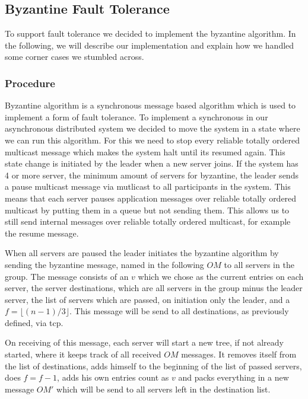 \documentclass[runningheads]{llncs}
\begin{document}
\subsection{Byzantine Fault Tolerance} \label{byzantine}

To support fault tolerance we decided to implement the byzantine algorithm. In
the following, we will describe our implementation and explain how we handled
some corner cases we stumbled across.

\subsubsection{Procedure} \label{byzantineprocedure}

Byzantine algorithm is a synchronous message based algorithm which is used to
implement a form of fault tolerance. To implement a synchronous in our
asynchronous distributed system we decided to move the system in a state where
we can run this algorithm. For this we need to stop every reliable totally
ordered multicast message which makes the system halt until its resumed again.
This state change is initiated by the leader when a new server joins. If the
system has 4 or more server, the minimum amount of servers for byzantine, the
leader sends a pause multicast message via mutlicast to all participants in the
system. This means that each server pauses application messages over reliable
totally ordered multicast by putting them in a queue but not sending them. This
allows us to still send internal messages over reliable totally ordered
multicast, for example the resume message.

When all servers are paused the leader initiates the byzantine algorithm by
sending the byzantine message, named in the following $OM$ to all servers in
the group. The message consists of an $v$ which we chose as the current entries
on each server, the server destinations, which are all servers in the group
minus the leader server, the list of servers which are passed, on initiation
only the leader, and a $f = \lfloor (n - 1)/ 3 \rfloor$. This message will be
send to all destinations, as previously defined, via tcp.

On receiving of this message, each server will start a new tree, if not already
started, where it keeps track of all received $OM$ messages. It removes itself
from the list of destinations, adds himself to the beginning of the list of
passed servers, does $f = f - 1$, adds his own entries count as $v$ and packs
everything in a new message $OM'$ which will be send to all servers left in the
destination list.
\end{document}
